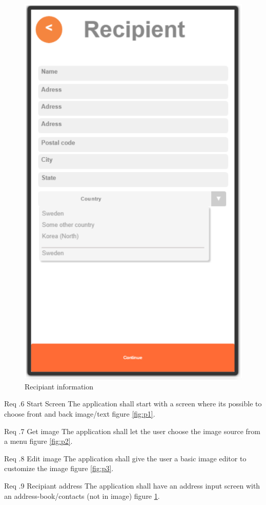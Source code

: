 \documentclass[10pt,a4paper]{article}
\newcommand{\tsss}{\thesubsubsection}
\begin{document}
\begin {description}
\begin{figure}
\begin{minipage}{0.35\textwidth}
		\includegraphics[width=\linewidth]{Prototype_img/p4.png}
		\caption{Recipiant information}
		\label{fig:p4}
	\end{minipage}
\end{figure}

\item[Req \tsss.6 Start Screen] The application shall start with a screen where its possible to choose front and back image/text figure \ref{fig:p1}.
\item[Req \tsss.7 Get image] The application shall let the user choose the image source from a menu figure \ref{fig:p2}.
\item[Req \tsss.8 Edit image]The application shall give the user a basic image editor to customize the image figure \ref{fig:p3}.
\item[Req \tsss.9 Recipiant address] The application shall have an address input screen with an address-book/contacts (not in image) figure \ref{fig:p4}.
\end{description}
\end{document}
